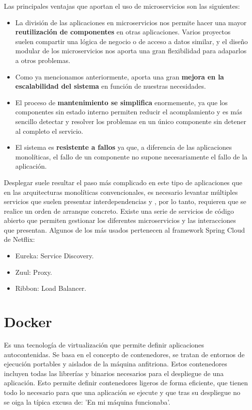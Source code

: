 Las principales ventajas que aportan el uso de microservicios son las siguientes:
\begin{itemize}
\item La división de las aplicaciones en microservicios nos permite hacer una mayor \textbf{reutilización de componentes} en otras aplicaciones. Varios proyectos suelen compartir una lógica de negocio o de acceso a datos similar, y el diseño modular de los microservicios nos aporta una gran flexibilidad para adaparlos a otros problemas.
\item Como ya mencionamos anteriormente, aporta una gran \textbf{mejora en la escalabilidad del sistema} en función de nuestras necesidades.
\item El proceso de \textbf{mantenimiento se simplifica} enormemente, ya que los componentes sin estado interno permiten reducir el acomplamiento y es más sencillo detectar y resolver los problemas en un único componente sin detener al completo el servicio.
\item El sistema es \textbf{resistente a fallos} ya que, a diferencia de las aplicaciones monolíticas, el fallo de un componente no supone necesariamente el fallo de la aplicación.
\end{itemize}

Desplegar suele resultar el paso más complicado en este tipo de aplicaciones que en las arquitecturas monolíticas convencionales, es necesario levantar múltiples servicios que suelen presentar interdependencias y , por lo tanto, requieren que se realice un orden de arranque concreto. Existe una serie de servicios de código abierto que permiten gestionar los diferentes microservicios y las interacciones que presentan. Algunos de los más usados pertenecen al framework Spring Cloud de Netflix:
\begin{itemize}
\item Eureka: Service Discovery.
\item Zuul: Proxy.
\item Ribbon: Load Balancer.
\end{itemize}



\vspace{1cm}
\section{Docker }\label{sec:docker}
Es una tecnología de virtualización que permite definir aplicaciones autocontenidas. Se basa en el concepto de contenedores, se tratan de entornos de ejecución portables y aislados de la máquina anfitriona. Estos contenedores incluyen todas las librerías y binarios necesarios para el despliegue de una aplicación. Esto permite definir contenedores ligeros de forma eficiente, que tienen todo lo necesario para que una aplicación se ejecute y que tras su despliegue no se oiga la típica excusa de: 'En mi máquina funcionaba'.

